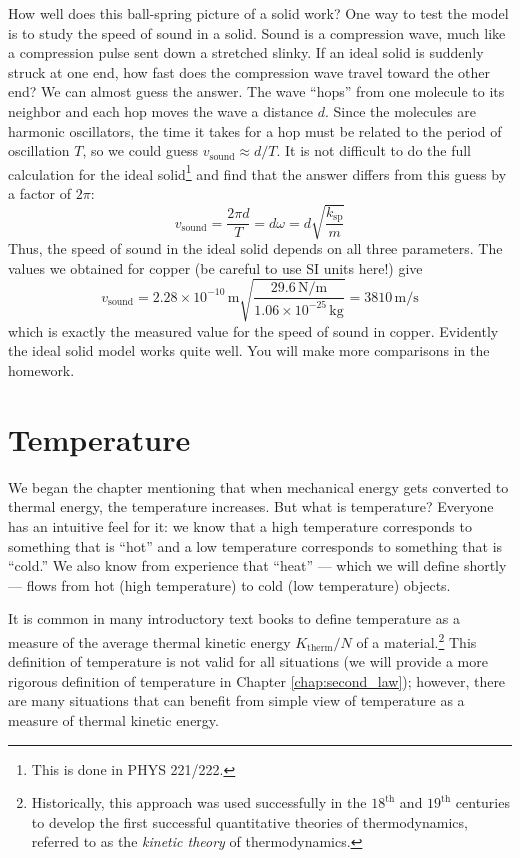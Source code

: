 How well does this ball-spring picture of a solid work? 
One way to test the model is to study the speed of sound in a
solid.  Sound is a compression wave, much like a compression pulse
sent down a stretched slinky.  If an ideal solid is suddenly
struck at one end, how fast does the compression wave travel toward
the other end?  We can almost guess the answer.  The wave ``hops''
from one molecule to its neighbor and each hop moves the wave a
distance $d$.  Since the molecules are harmonic oscillators, the time
it takes for a hop must be related to the period of oscillation $T$,
so we could guess $v_\text{sound} \approx d/T$.  It is not difficult
to do the full calculation for the ideal solid\footnote{This is
  done in PHYS 221/222.} and find that the answer differs from this
guess by a factor of $2\pi$:
\begin{equation}
v_\text{sound} = \frac{2\pi d}{T} = d\omega  = d\sqrt{\frac{k_\text{sp}}{m}}
\end{equation}
Thus, the speed of sound in the ideal solid depends on all three
parameters.  The values we obtained for copper (be careful to use SI
units here!) give
\begin{equation}
 v_\text{sound} = 2.28\times
 10^{-10}\,\text{m}\sqrt{\frac{29.6\,\text{N/m}}{1.06\times
     10^{-25}\,\text{kg}}} = 3810\,\text{m/s}
\end{equation}
which is exactly the measured value for the speed of sound in copper.
Evidently the ideal solid model works quite well.  You will make more
comparisons in the homework.

\section{Temperature}

We began the chapter mentioning that when mechanical energy gets
converted to thermal energy, the temperature increases.  But what is
temperature?  Everyone has an intuitive feel for it:  we know that a
high temperature corresponds to something that is ``hot'' and a low
temperature corresponds to something that is ``cold.''  We also know
from experience that ``heat'' --- which we will define shortly --- flows
from hot (high temperature) to cold (low temperature) objects.

It is common in many introductory text books to define temperature as
a measure of the average thermal kinetic energy $K_\text{therm}/N$ of
a material.\footnote{Historically, this approach was used successfully
  in the $18^\text{th}$ and $19^\text{th}$ centuries to develop the
  first successful quantitative theories of thermodynamics, referred
  to as the \emph{kinetic theory} of thermodynamics.}  This definition of
temperature is not valid for all situations (we will provide a more
rigorous definition of temperature in Chapter
\ref{chap:second_law}); however, there are many situations that can
benefit from simple view of temperature as a measure of thermal
kinetic energy.

